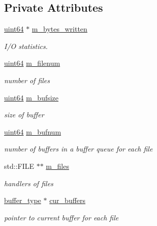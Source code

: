\subsection*{Private Attributes}
\begin{DoxyCompactItemize}
\item 
\hyperlink{types_8h_a60e8696a4678cd348e991a1f172e53f7}{uint64} $\ast$ \hyperlink{classasync__multi__stream__writer_a30c3a9ab1270eaff7fe8b2f1a98873b4}{m\+\_\+bytes\+\_\+written}
\begin{DoxyCompactList}\small\item\em I/O statistics. \end{DoxyCompactList}\item 
\hyperlink{types_8h_a60e8696a4678cd348e991a1f172e53f7}{uint64} \hyperlink{classasync__multi__stream__writer_ae22c4cf2e0d2e00668294cfa3ab2c0f7}{m\+\_\+filenum}
\begin{DoxyCompactList}\small\item\em number of files \end{DoxyCompactList}\item 
\hyperlink{types_8h_a60e8696a4678cd348e991a1f172e53f7}{uint64} \hyperlink{classasync__multi__stream__writer_af8bf043c48fb1ad0dfa3e0a562e0e891}{m\+\_\+bufsize}
\begin{DoxyCompactList}\small\item\em size of buffer \end{DoxyCompactList}\item 
\hyperlink{types_8h_a60e8696a4678cd348e991a1f172e53f7}{uint64} \hyperlink{classasync__multi__stream__writer_a60bb0c6df357c9c9719527d812136ef3}{m\+\_\+bufnum}
\begin{DoxyCompactList}\small\item\em number of buffers in a buffer queue for each file \end{DoxyCompactList}\item 
std\+::\+F\+I\+LE $\ast$$\ast$ \hyperlink{classasync__multi__stream__writer_aa5b6be346293202ba59ff0d62f0a1196}{m\+\_\+files}
\begin{DoxyCompactList}\small\item\em handlers of files \end{DoxyCompactList}\item 
\hyperlink{classasync__multi__stream__writer_ae11c006e394241a9a5b003a30e8c8c92}{buffer\+\_\+type} $\ast$ \hyperlink{classasync__multi__stream__writer_af1f19cbe619c771f1786abc038146e72}{cur\+\_\+buffers}
\begin{DoxyCompactList}\small\item\em pointer to current buffer for each file \end{DoxyCompactList}\item 
$$
\end{DoxyCompactItemize}
